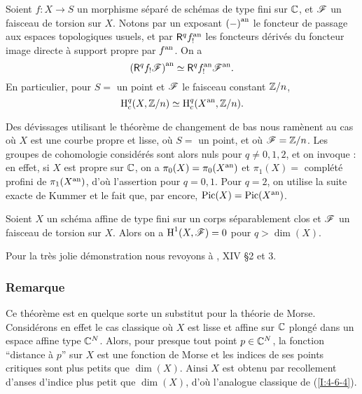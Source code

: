 \documentclass[oneside]{book}
\begin{document}
\begin{theorem}\label{I:4-6-3}
Soient $f:X\to S$ un morphisme séparé de schémas de type fini sur $\mathbb{C}$, 
et $\mathscr{F}$ un faisceau de torsion sur $X$. Notons par un exposant ${(-)}^{\textnormal{an}}$ le 
foncteur de passage aux espaces topologiques usuels, et par $\mathsf{R}^q {f}^{\textnormal{an}}_!$ les 
foncteurs dérivés du foncteur image directe à support propre par ${f}^{\textnormal{an}}$. On a 
\[
  {(\mathsf{R}^q f_! \mathscr{F})}^{\textnormal{an}} \simeq \mathsf{R}^q {f}^{\textnormal{an}}_! {\mathscr{F}}^{\textnormal{an}} \text{.}
\]
En particulier, pour $S=$ un point et $\mathscr{F}$ le faisceau constant $\mathbb{Z}/n$, 
\[
  \operatorname{H}_c^q(X,\mathbb{Z}/n) \simeq \operatorname{H}_c^q({X}^{\textnormal{an}},\mathbb{Z}/n)\text{.}
\]
\end{theorem}

Des dévissages utilisant le théorème de changement de bas nous ramènent au 
cas où $X$ est une courbe propre et lisse, où $S=$ un point, et où 
$\mathscr{F}=\mathbb{Z}/n$. Les groupes de cohomologie considérés sont alors nuls pour 
$q\ne 0,1,2$, et on invoque \cite{12}: en effet, si $X$ est propre sur $\mathbb{C}$, 
on a $\pi_0(X) = \pi_0({X}^{\textnormal{an}})$ et $\pi_1(X) = $ complété profini de 
$\pi_1({X}^{\textnormal{an}})$, d'où l'assertion pour $q=0,1$. Pour $q=2$, on utilise la 
suite exacte de Kummer et le fait que, par \cite{12} encore, 
$\operatorname{Pic}(X)=\operatorname{Pic}({X}^{\textnormal{an}})$. 





\begin{theorem}\label{I:4-6-4}
Soient $X$ un schéma affine de type fini sur un corps séparablement clos et 
$\mathscr{F}$ un faisceau de torsion sur $X$. Alors on a $\operatorname{H}^1(X,\mathscr{F}) = 0$ pour 
$q>\dim(X)$. 
\end{theorem}

Pour la très jolie démonstration nous revoyons à \cite{4}, XIV \S 2 et 3. 





\subsubsection{Remarque}\label{I:4-6-5}

Ce théorème est en quelque sorte un substitut pour la théorie de Morse. 
Considérons en effet le cas classique où $X$ est lisse et affine sur $\mathbb{C}$ 
plongé dans un espace affine type $\mathbb{C}^N$. Alors, pour presque tout point 
$p\in\mathbb{C}^N$, la fonction ``distance à $p$'' sur $X$ est une fonction de Morse 
et les indices de ses points critiques sont plus petits que $\dim(X)$. Ainsi 
$X$ est obtenu par recollement d'anses d'indice plus petit que $\dim(X)$, d'où 
l'analogue classique de (\ref{I:4-6-4}). 
\end{document}
